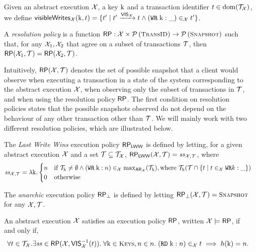 Given an abstract execution $\mathcal{X}$, a key $\mathrm{k}$ and a transaction identifier $t \in \operatorname{dom}(\mathcal{T}_{\mathcal{X}})$, we 
define $\mathsf{visibleWrites}_{{\mathcal{X}}}(\mathrm{k}, t) = \{ t' \mid t' \xrightarrow{{\mathsf{VIS}}_{{\mathcal{X}}}} t \wedge ({{\tt WR}}\;\mathrm{k}:\_) 
\in_{\mathcal{X}} t' \}$.

\begin{definition}
A \emph{resolution policy} \RP is a function $\RP: \aexec \times \powerset{\TxID} \rightarrow \powerset{\Snapshots}$ 
such that, for any $\mathcal{X}_1, \mathcal{X}_2$ that agree on a subset of transactions $\mathcal{T}$, then $\mathsf{RP}(\mathcal{X}_1, \mathcal{T}) = 
\mathsf{RP}(\mathcal{X}_2, \mathcal{T})$.
\end{definition}
Intuitively, $\mathsf{RP}(\mathcal{X}, \mathcal{T})$ denotes the set of possible snapshot that a client would observe when executing a transaction 
in a state of the system corresponding to the abstract execution $\mathcal{X}$, when observing only the subset 
of transactions in $\mathcal{T}$, and when using the resolution policy $\mathsf{RP}$. The first condition on resolution policies 
states that the possible snapshots observed do not depend on the behaviour of any other transaction other 
than $\mathcal{T}$.
We will mainly work with two different 
resolution policies, which are illustrated below. 

\begin{example}
The \emph{Last Write Wins} execution policy $\mathsf{RP}_{\mathsf{LWW}}$ is defined by letting, for a given abstract execution 
$\mathcal{X}$ and a set $\mathcal{T} \subseteq \mathcal{T}_{\mathcal{X}}$, $\mathsf{RP}_{\mathsf{LWW}}(\mathcal{X}, \mathcal{T}) = \mathit{ss}_{\mathcal{X}, \mathcal{T}}$, where
\[
\mathit{ss}_{\mathcal{X}, \mathcal{T}} = \lambda \mathrm{k}.
\begin{cases}
n & \text{if } \mathcal{T}_{\mathrm{k}} \neq \emptyset \wedge ({{\tt WR}}\; \mathrm{k}: n) \in_{\mathcal{X}} \max_{{\sf{AR}}_{\mathcal{X}}}(\mathcal{T}_{\mathrm{k}}), \text{where } 
\mathcal{T}_{\mathrm{k}} (\mathcal{T} \cap \{t \mid t \in_{\mathcal{X}} {{\tt WR}} k: \_ \})\\
0 & \text{otherwise} 
\end{cases}
\]

The \emph{anarchic} execution policy $\mathsf{RP}_{\bot}$ is defined by letting $\RP_{\bot}(\aexec, \T) = \Snapshots$ for any $\mathcal{X}, \mathcal{T}$.
\end{example}

\begin{definition}
An abstract execution $\mathcal{X}$ satisfies an execution policy $\mathsf{RP}$, written $\mathcal{X} \models \mathsf{RP}$, if and only if, 
\[
\forall \tsid \in \T_{\aexec}. \exists \h \in \RP(\aexec, \VIS_{\aexec}^{-1}(\tsid)).\;
\forall \key{k} \in \Addr, n \in \nat.\; (\RD\;\key{k}: n) \in_{\aexec} \tsid \implies 
h(\key{k}) = n.
\]
\end{definition}

